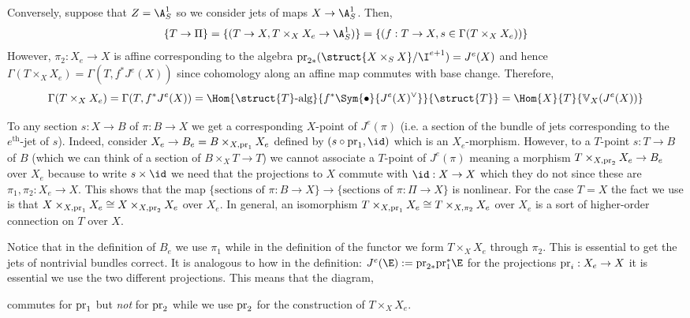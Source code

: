 \documentclass[12pt]{article}
\begin{document}
\newcommand{\VV}{\mathbb{V}}

\begin{example}
Conversely, suppose that $Z = \A^1_S$ so we consider jets of maps $X \to \A^1_S$. Then,
\[ \{ T \to \Pi \} = \{ (T \to X, T \times_X X_e \to \A^1_S) \} = \{ (f : T \to X, s \in \Gamma(T \times_X X_e)) \} \] 
However, $\pi_2 : X_e \to X$ is affine corresponding to the algebra $\pr_{2*} (\struct{X \times_S X} / \I^{e+1}) = J^e(X)$ and hence $\Gamma(T \times_X X_e) = \Gamma(T, f^* J^e(X))$ since cohomology along an affine map commutes with base change. Therefore,
\[ \Gamma(T \times_X X_e) = \Gamma(T, f^* J^e(X)) = \Hom{\struct{T}\text{-alg}}{f^* \Sym{\bullet}{J^e(X)^\vee}}{\struct{T}} = \Hom{X}{T}{\VV_X(J^e(X))} \]
\end{example}

\begin{rmk}
To any section $s : X \to B$ of $\pi : B \to X$ we get a corresponding $X$-point of $J^e(\pi)$ (i.e. a section of the bundle of jets corresponding to the $e^{\text{th}}$-jet of $s$). Indeed, consider $X_e \to B_e = B \times_{X, \mathrm{pr}_1} X_e$ defined by $(s \circ \pr_1, \id)$ which is an $X_e$-morphism. However, to a $T$-point $s : T \to B$   of $B$ (which we can think of a section of $B \times_X T \to T$) we cannot associate a $T$-point of $J^e(\pi)$ meaning a morphism $T \times_{X, \mathrm{pr}_2} X_e \to B_e$ over $X_e$ because to write $s \times \id$ we need that the projections to $X$ commute with $\id : X \to X$ which they do not since these are $\pi_1, \pi_2 : X_e \to X$. This shows that the map $\{ \text{sections of } \pi : B \to X \} \to \{ \text{sections of } \pi : \Pi \to X \}$ is nonlinear. For the case $T = X$ the fact we use is that $X \times_{X, \mathrm{pr}_1} X_e \cong X \times_{X, \mathrm{pr}_2} X_e$ over $X_e$. In general, an isomorphism $T \times_{X, \mathrm{pr}_1} X_e \cong T \times_{X, \pi_2} X_e$ over $X_e$ is a sort of higher-order connection on $T$ over $X$.
\end{rmk}

\begin{rmk}
Notice that in the definition of $B_e$ we use $\pi_1$ while in the definition of the functor we form $T \times_X X_e$ through $\pi_2$. This is essential to get the jets of nontrivial bundles correct. It is analogous to how in the definition: $J^e(\E) := \pr_{2*} \pr_1^* \E$ for the projections $\mathrm{pr}_i : X_e \to X$ it is essential we use the two different projections. This means that the diagram,
\begin{center}
\end{center}
commutes for $\mathrm{pr}_1$ but \textit{not} for $\mathrm{pr}_2$ while we use $\mathrm{pr}_2$ for the construction of $T \times_X X_e$. 
\end{rmk}
\end{document}
